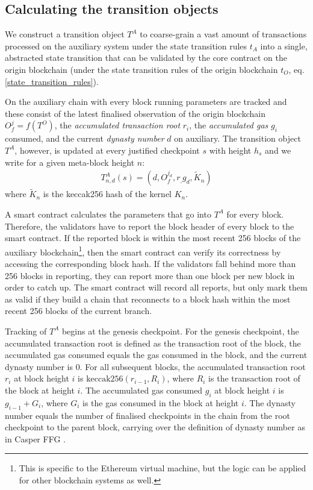 \documentclass[12pt,a4paper]{article}
\begin{document}
\subsection{Calculating the transition objects}

We construct a transition object $T^A$ to coarse-grain a vast amount of transactions processed on the auxiliary system under the state transition rules $t_A$ into a single, abstracted state transition that can be validated by the core contract on the origin blockchain (under the state transition rules of the origin blockchain $t_O$, eq. \ref{state_transition_rules}).

On the auxiliary chain with every block running parameters are tracked and these consist of the latest finalised observation of the origin blockchain $O^j_f= f(T^O)$, the \emph{accumulated transaction root} $r_i$, the \emph{accumulated gas} $g_i$ consumed, and the current \emph{dynasty number} $d$ on auxiliary.  The transition object $T^A$, however, is updated at every justified checkpoint $s$ with height $h_s$ and we write for a given meta-block height $n$:
\begin{align*}
  T^A_{n,d}(s) = (d, O^{j_d}_f, r_, g_d, \tilde{K}_n)
\end{align*}
where $\tilde{K}_n$ is the keccak256 hash of the kernel $K_n$.

A smart contract calculates the parameters that go into $T^A$ for every block. Therefore, the validators have to report the block header of every block to the smart contract. If the reported block is within the most recent 256 blocks of the auxiliary blockchain\footnote{This is specific to the Ethereum virtual machine, but the logic can be applied for other blockchain systems as well.}, then the smart contract can verify its correctness by accessing the corresponding block hash. If the validators fall behind more than 256 blocks in reporting, they can report more than one block per new block in order to catch up. The smart contract will record all reports, but only mark them as valid if they build a chain that reconnects to a block hash within the most recent 256 blocks of the current branch.

Tracking of $T^A$ begins at the genesis checkpoint. For the genesis checkpoint, the accumulated transaction root is defined as the transaction root of the block, the accumulated gas consumed equals the gas consumed in the block, and the current dynasty number is 0.
For all subsequent blocks, the accumulated transaction root $r_i$ at block height $i$ is $\text{keccak256}(r_{i-1}, R_i)$, where $R_i$ is the transaction root of the block at height $i$.
The accumulated gas consumed $g_i$ at block height $i$ is $g_{i-1} + G_i$, where $G_i$ is the gas consumed in the block at height $i$.
The dynasty number equals the number of finalised checkpoints in the chain from the root checkpoint to the parent block, carrying over the definition of dynasty number as in Casper FFG \cite{casperffg}.
\end{document}
